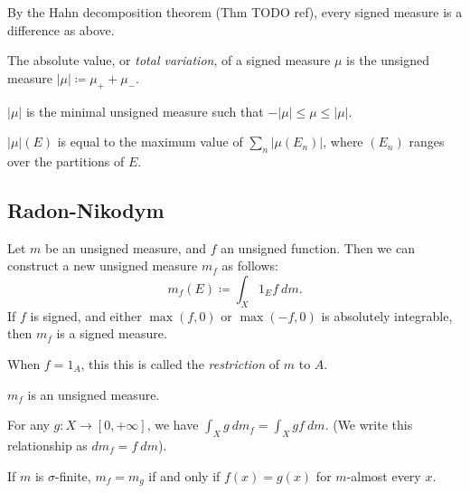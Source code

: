 \documentclass[12pt]{article}
\begin{document}
\begin{remark}[]
	By the Hahn decomposition theorem (Thm TODO ref), every signed measure is a difference as above.
\end{remark}

\begin{proposition}
	The absolute value, or \emph{total variation}, of a signed measure $\mu$ is the unsigned measure $|\mu|\coloneqq \mu_+ + \mu_-$.
\end{proposition}

\begin{proposition}[]
	$|\mu|$ is the minimal unsigned measure such that $- |\mu| \leq \mu \leq |\mu|$.
\end{proposition}

\begin{proposition}[]
	$|\mu|(E)$ is equal to the maximum value of $\sum_n |\mu(E_n)|$, where $(E_n)$ ranges over the partitions of $E$.
\end{proposition}

\subsection{Radon-Nikodym}

\begin{definition}
	Let $m$ be an unsigned measure, and $f$ an unsigned function. Then we can construct a new unsigned measure 
	$m_f$ as follows:
	\begin{equation*}
		m_f(E)\coloneqq\int_X 1_E f\ dm.
	\end{equation*}
	If $f$ is signed, and either $\max(f,0)$ or $\max(-f,0)$ is absolutely integrable, then $m_f$ is a signed measure.
\end{definition}

\begin{remark}[]
	When $f=1_A$, this this is called the \emph{restriction} of $m$ to $A$.
\end{remark}

\begin{proposition}[]
	$m_f$ is an unsigned measure.
\end{proposition}

\begin{proposition}[]
	For any $g:X\to[0,+\infty]$, we have $\int_X g\ dm_f = \int_X gf\ dm$. (We write this relationship as $dm_f=f\ dm$).
\end{proposition}

\begin{proposition}[]
	If $m$ is $\sigma$-finite, $m_f=m_g$ if and only if $f(x)=g(x)$ for $m$-almost every $x$.
\end{proposition}
\end{document}
